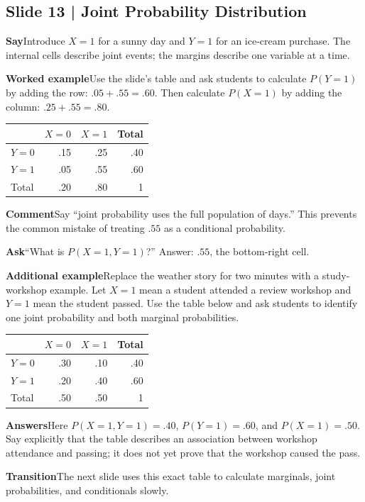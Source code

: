 \documentclass[11pt,a4paper]{article}
\newcommand{\slideheading}[1]{\subsection*{\color{accent}#1}}
\newcommand{\cue}[2]{\par\noindent\textbf{#1}\quad #2\par}
\begin{document}
\slideheading{Slide 13 | Joint Probability Distribution}
\cue{Say}{Introduce $X=1$ for a sunny day and $Y=1$ for an ice-cream purchase. The internal cells describe joint events; the margins describe one variable at a time.}
\cue{Worked example}{Use the slide's table and ask students to calculate $P(Y=1)$ by adding the row: $.05+.55=.60$. Then calculate $P(X=1)$ by adding the column: $.25+.55=.80$.}
\begin{center}\begin{tabular}{lrrr}\toprule & $X=0$ & $X=1$ & Total\\\midrule $Y=0$ & .15 & .25 & .40\\ $Y=1$ & .05 & .55 & .60\\\midrule Total & .20 & .80 & 1\\\bottomrule\end{tabular}\end{center}
\cue{Comment}{Say ``joint probability uses the full population of days.'' This prevents the common mistake of treating $.55$ as a conditional probability.}
\cue{Ask}{``What is $P(X=1,Y=1)$?'' Answer: $.55$, the bottom-right cell.}
\cue{Additional example}{Replace the weather story for two minutes with a study-workshop example. Let $X=1$ mean a student attended a review workshop and $Y=1$ mean the student passed. Use the table below and ask students to identify one joint probability and both marginal probabilities.}
\begin{center}\small
\begin{tabular}{lrrr}\toprule
 & $X=0$ & $X=1$ & Total\\\midrule
$Y=0$ & .30 & .10 & .40\\
$Y=1$ & .20 & .40 & .60\\\midrule
Total & .50 & .50 & 1\\\bottomrule
\end{tabular}
\end{center}
\cue{Answers}{Here $P(X=1,Y=1)=.40$, $P(Y=1)=.60$, and $P(X=1)=.50$. Say explicitly that the table describes an association between workshop attendance and passing; it does not yet prove that the workshop caused the pass.}
\cue{Transition}{The next slide uses this exact table to calculate marginals, joint probabilities, and conditionals slowly.}
\end{document}
